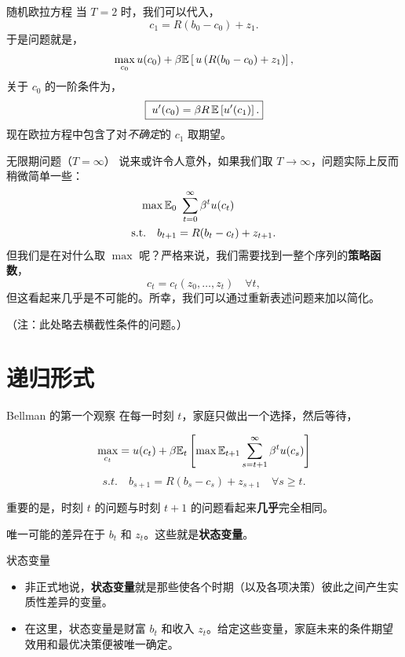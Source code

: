 \documentclass[10pt,aspectratio=169]{beamer}
\begin{document}
\begin{frame}{随机欧拉方程}
  当 $T = 2$ 时，我们可以代入，
  \[
    c_1 = R(b_0 - c_0) + z_1.
  \]
  于是问题就是，
  \[
    \max_{c_0} u(c_0) + \beta \mathbb{E}\left[\, u\left(R(b_0 - c_0) + z_1\right) \right],
  \]
  关于 $c_0$ 的一阶条件为，
  \[
    \boxed{\;u'(c_0) = \beta R \, \mathbb{E}\left[ u'(c_1) \right].}
  \]
  现在欧拉方程中包含了对\emph{不确定}的 $c_1$ 取期望。
\end{frame}

\begin{frame}{无限期问题（$T = \infty$）}
  说来或许令人意外，如果我们取 $T\to\infty$，问题实际上反而稍微简单一些：
  \begin{align*}
    \max \mathbb{E}_0 & \ \sum_{t=0}^{\infty} \beta^t u(c_t)\\
    \text{s.t.}\quad b_{t+1} &= R(b_t - c_t) + z_{t+1}.
  \end{align*}
  但我们是在对什么取 $\max$ 呢？严格来说，我们需要找到一整个序列的\textbf{策略函数}，
  \[
    c_t = c_t(z_0, \ldots, z_t) \quad \forall t,
  \]
  但这看起来几乎是不可能的。所幸，我们可以通过重新表述问题来加以简化。

  （注：此处略去横截性条件的问题。）
\end{frame}

\section{递归形式}

\begin{frame}{Bellman 的第一个观察}
  在每一时刻 $t$，家庭只做出一个选择，然后等待，

  \[
    \max_{c_t} = u(c_t) + \beta \mathbb{E}_t\left[ \max \mathbb{E}_{t+1}\sum_{s=t+1}^\infty \beta^t u(c_s) \right]
  \]
  \[
    s.t. \quad b_{s+1} = R(b_s - c_s) + z_{s+1} \quad\forall s \ge t.
  \]

  重要的是，时刻 $t$ 的问题与时刻 $t+1$ 的问题看起来\textbf{几乎}完全相同。

  唯一可能的差异在于 $b_t$ 和 $z_t$。这些就是\textbf{状态变量}。
\end{frame}

\begin{frame}{状态变量}
  \begin{itemize}
    \item 非正式地说，\textbf{状态变量}就是那些使各个时期（以及各项决策）彼此之间产生实质性差异的变量。
    \item 在这里，状态变量是财富 $b_t$ 和收入 $z_t$。给定这些变量，家庭未来的条件期望效用和最优决策便被唯一确定。
  \end{itemize}
\end{frame}
\end{document}
